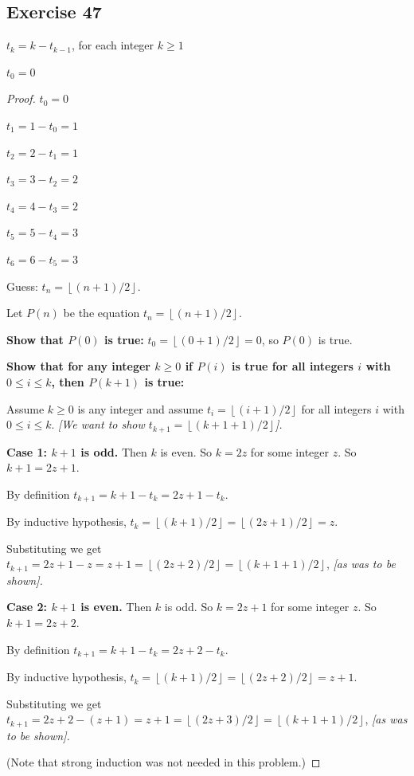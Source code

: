 \documentclass[14pt]{extarticle}
\newcommand{\dps}{\displaystyle}
\newcommand{\floor}[1]{{\left\lfloor#1\right\rfloor}}
\begin{document}
\subsection{Exercise 47}
\(t_k = k - t_{k-1}\), for each integer \(k \geq 1\)

\(t_0 = 0\)

\begin{proof}
\(t_0 = 0\)

\(t_1 = 1 - t_0 = 1\)

\(t_2 = 2 - t_1 = 1\)

\(t_3 = 3 - t_2 = 2\)

\(t_4 = 4 - t_3 = 2\)

\(t_5 = 5 - t_4 = 3\)

\(t_6 = 6 - t_5 = 3\)

Guess: \(t_n = \floor{(n+1)/2}\).

Let \(P(n)\) be the equation \(t_n = \floor{(n+1)/2}\).

{\bf Show that $P(0)$ is true:} \(t_0 = \floor{(0+1)/2} = 0\), so $P(0)$ is true.

{\bf Show that for any integer \(k \geq 0\) if $P(i)$ is true for all integers $i$ with \(0 \leq i \leq k\), then
$P(k+1)$ is true:}

Assume \(k \geq 0\) is any integer and assume \(t_i = \floor{(i+1)/2}\) for all integers $i$ with 
\(0 \leq i \leq k\). {\it [We want to show \(t_{k+1} = \floor{(k+1+1)/2}\)].}

{\bf Case 1: $k+1$ is odd.} Then $k$ is even. So $k = 2z$ for some integer $z$. So $k+1 = 2z+1$.

By definition \(t_{k+1} = k+1 - t_k = 2z+1 - t_k\).

By inductive hypothesis, \(\dps t_k = \floor{(k+1)/2} = \floor{(2z+1)/2} = z\).

Substituting we get \(\dps t_{k+1} = 2z+1 - z = z+1 = \floor{(2z+2)/2} = \floor{(k+1+1)/2}\), 
{\it [as was to be shown].}

{\bf Case 2: $k+1$ is even.} Then $k$ is odd. So $k = 2z+1$ for some integer $z$. So $k+1 = 2z+2$.

By definition \(t_{k+1} = k+1 - t_k = 2z+2 - t_k\).

By inductive hypothesis, \(\dps t_k = \floor{(k+1)/2} = \floor{(2z+2)/2} = z+1\).

Substituting we get \(\dps t_{k+1} = 2z+2 - (z+1) = z+1 = \floor{(2z+3)/2} = \floor{(k+1+1)/2}\),
{\it [as was to be shown].}

(Note that strong induction was not needed in this problem.)
\end{proof}
\end{document}
